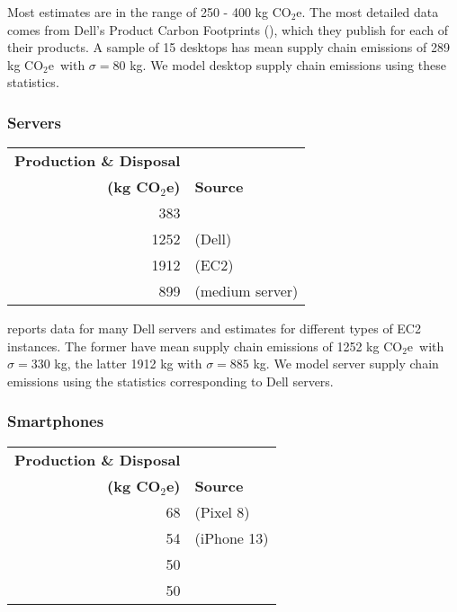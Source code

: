 \documentclass[11pt]{article}
\newcommand{\assumption}[1]{{#1}}
\newcommand{\coe}{CO$_2$e}
\newcommand{\gcoe}{g \coe}
\newcommand{\kgcoe}{k\gcoe}
\begin{document}
Most estimates are in the range of 250 - 400 \kgcoe. The most detailed data comes from
Dell's Product Carbon Footprints (\cite{dellpcf}), which they publish for each of their products.
A sample of 15 desktops has mean supply chain emissions of 289 \kgcoe\ with $\sigma = 80$ kg.
\assumption{We model desktop supply chain emissions using these statistics.}

\subsubsection{Servers}

\begin{center}
\begin{tabular}{|r|l|}
\hline
\textbf{Production \& Disposal} & \\
\textbf{(\kgcoe)} & \textbf{Source} \\ \hline
383 & \textcite{teehan2013} \\ \hline
1252 & \textcite{davy2021} (Dell) \\ \hline
1912 & \textcite{davy2021} (EC2) \\ \hline
899 & \textcite{boavizta} (medium server)\\ \hline
\end{tabular}
\label{tab:embodied_emissions:servers}
\end{center}

\textcite{davy2021} reports data for many Dell servers and estimates for different types of EC2 instances.
The former have mean supply chain emissions of 1252 \kgcoe\ with $\sigma = 330$ kg, the latter
1912 kg with $\sigma = 885$ kg.
\assumption{We model server supply chain emissions using the statistics corresponding to Dell servers.}

\subsubsection{Smartphones}

\begin{center}
\begin{tabular}{|r|l|}
\hline
\textbf{Production \& Disposal} & \\
\textbf{(\kgcoe)} & \textbf{Source} \\ \hline
68 & \textcite{googlepixel8} (Pixel 8)\\ \hline
54 & \textcite{appleiphone13} (iPhone 13)\\ \hline
50 & \textcite{unctadder2024} \\ \hline
50 & \textcite{lovehagen2023} \\ \hline
\end{tabular}
\label{tab:embodied_emissions:phones}
\end{center}
\end{document}
